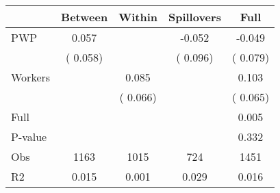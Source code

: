 
\begin{tabular}{l*{4}{c}}\hline&\multicolumn{1}{c}{Between}&\multicolumn{1}{c}{Within}&\multicolumn{1}{c}{Spillovers}&\multicolumn{1}{c}{Full}\\ \hline
 PWP           &              0.057      &                                               &       -0.052 &        -0.049                            \\ 
                               &        (       0.058)           &                                       &       (       0.096)     &      (       0.079)                                           \\ 
 Workers       &                                               &        0.085    &                                &             0.103                            \\ 
                               &                                               & (       0.066)                  &                                        &      (       0.065)                                           \\ 
\hline                                                                                                                                                                                                                                            
 Full                  &                                               &                                               &                                        &             0.005                                     \\ 
 P-value               &                                               &                                               &                                        &             0.332                                           \\ 
 Obs                   &               1163               &       1015                       &       724                &              1451                                               \\ 
 R2                    &                      0.015              &              0.001                      &              0.029               &                     0.016                                              \\ 
\hline \end{tabular}                                                                                                                                                                                                              